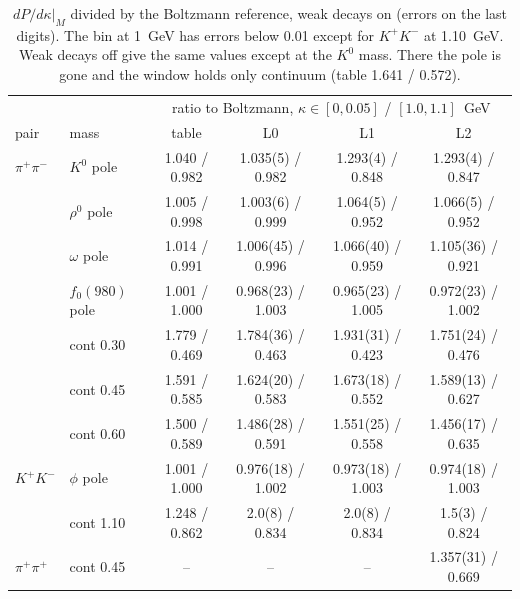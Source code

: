 \documentclass[11pt,a4paper]{article}
\begin{document}
\begin{table}[H]
\centering\small
\begin{tabular}{llcccc}
\toprule
& & \multicolumn{4}{c}{ratio to Boltzmann, $\kappa\in[0,0.05]$ / $[1.0,1.1]$~GeV} \\
pair & mass & table & L0 & L1 & L2 \\
\midrule
$\pi^+\pi^-$ & $K^0$ pole   & 1.040 / 0.982 & 1.035(5) / 0.982 & 1.293(4) / 0.848 & 1.293(4) / 0.847 \\
             & $\rho^0$ pole & 1.005 / 0.998 & 1.003(6) / 0.999 & 1.064(5) / 0.952 & 1.066(5) / 0.952 \\
             & $\omega$ pole & 1.014 / 0.991 & 1.006(45) / 0.996 & 1.066(40) / 0.959 & 1.105(36) / 0.921 \\
             & $f_0(980)$ pole & 1.001 / 1.000 & 0.968(23) / 1.003 & 0.965(23) / 1.005 & 0.972(23) / 1.002 \\
             & cont 0.30 & 1.779 / 0.469 & 1.784(36) / 0.463 & 1.931(31) / 0.423 & 1.751(24) / 0.476 \\
             & cont 0.45 & 1.591 / 0.585 & 1.624(20) / 0.583 & 1.673(18) / 0.552 & 1.589(13) / 0.627 \\
             & cont 0.60 & 1.500 / 0.589 & 1.486(28) / 0.591 & 1.551(25) / 0.558 & 1.456(17) / 0.635 \\
$K^+K^-$     & $\phi$ pole & 1.001 / 1.000 & 0.976(18) / 1.002 & 0.973(18) / 1.003 & 0.974(18) / 1.003 \\
             & cont 1.10 & 1.248 / 0.862 & 2.0(8) / 0.834 & 2.0(8) / 0.834 & 1.5(3) / 0.824 \\
$\pi^+\pi^+$ & cont 0.45 & -- & -- & -- & 1.357(31) / 0.669 \\
\bottomrule
\end{tabular}
\caption{$dP/d\kappa|_M$ divided by the Boltzmann reference, weak decays on (errors on the last
digits). The bin at 1~GeV has errors below 0.01 except for $K^+K^-$ at 1.10~GeV. Weak decays off
give the same values except at the $K^0$ mass. There the pole is gone and the window holds only
continuum (table 1.641 / 0.572).}
\label{tab:thermal}
\end{table}
\end{document}

